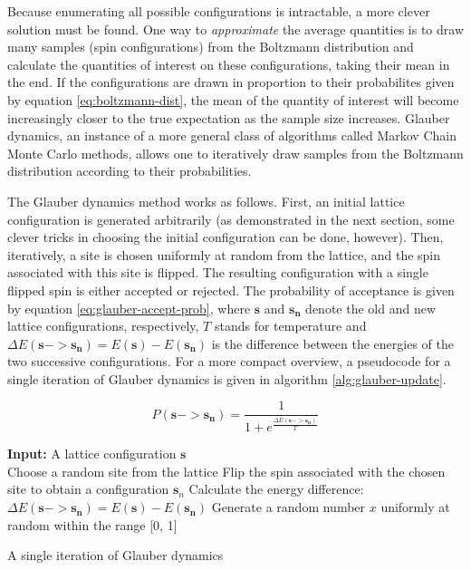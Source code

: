 \documentclass[12pt]{article}
\begin{document}
Because enumerating all possible configurations is intractable, a more clever solution must be found. One way to \textit{approximate} the average quantities is to draw many samples (spin configurations) from the Boltzmann distribution and calculate the quantities of interest on these configurations, taking their mean in the end. If the configurations are drawn in proportion to their probabilites given by equation \ref{eq:boltzmann-dist}, the mean of the quantity of interest will become increasingly closer to the true expectation as the sample size increases. Glauber dynamics, an instance of a more general class of algorithms called Markov Chain Monte Carlo methods, allows one to iteratively draw samples from the Boltzmann distribution according to their probabilities.

The Glauber dynamics method works as follows. First, an initial lattice configuration is generated arbitrarily (as demonstrated in the next section, some clever tricks in choosing the initial configuration can be done, however). Then, iteratively, a site is chosen uniformly at random from the lattice, and the spin associated with this site is flipped. The resulting configuration with a single flipped spin is either accepted or rejected. The probability of acceptance is given by equation \ref{eq:glauber-accept-prob}, where $\boldsymbol{s}$ and $\boldsymbol{s_n}$ denote the old and new lattice configurations, respectively, $T$ stands for temperature and $\Delta E(\boldsymbol{s} -> \boldsymbol{s_n}) = E(\boldsymbol{s}) - E(\boldsymbol{s_n})$ is the difference between the energies of the two successive configurations. For a more compact overview, a pseudocode for a single iteration of Glauber dynamics is given in algorithm \ref{alg:glauber-update}.

\begin{equation}
P(\boldsymbol{s} -> \boldsymbol{s_n}) = \frac{1}{1 + e^\frac{\Delta E(\boldsymbol{s} -> \boldsymbol{s_n})}{T}}
\label{eq:glauber-accept-prob}
\end{equation}

\begin{algorithm}
\textbf{Input:} A lattice configuration $\boldsymbol{s}$ \\
Choose a random site from the lattice\;
Flip the spin associated with the chosen site to obtain a configuration $\boldsymbol{s}_n$\;
Calculate the energy difference: $\Delta E(\boldsymbol{s} -> \boldsymbol{s_n}) = E(\boldsymbol{s}) - E(\boldsymbol{s_n})$\;
Generate a random number $x$ uniformly at random within the range [0, 1]\;
\caption{A single iteration of Glauber dynamics}
\label{alg:glauber-update}
\end{algorithm}
\end{document}
